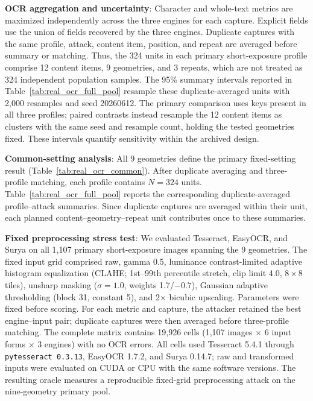 \documentclass{ieeeaccess}
\begin{document}
\textbf{OCR aggregation and uncertainty}: Character and whole-text metrics are maximized independently across the three engines for each capture. Explicit fields use the union of fields recovered by the three engines. Duplicate captures with the same profile, attack, content item, position, and repeat are averaged before summary or matching. Thus, the 324 units in each primary short-exposure profile comprise 12 content items, 9 geometries, and 3 repeats, which are not treated as 324 independent population samples. The 95\% summary intervals reported in Table~\ref{tab:real_ocr_full_pool} resample these duplicate-averaged units with 2,000 resamples and seed 20260612. The primary comparison uses keys present in all three profiles; paired contrasts instead resample the 12 content items as clusters with the same seed and resample count, holding the tested geometries fixed. These intervals quantify sensitivity within the archived design.

\textbf{Common-setting analysis}: All 9 geometries define the primary fixed-setting result (Table~\ref{tab:real_ocr_common}). After duplicate averaging and three-profile matching, each profile contains $N=324$ units. Table~\ref{tab:real_ocr_full_pool} reports the corresponding duplicate-averaged profile--attack summaries. Since duplicate captures are averaged within their unit, each planned content--geometry--repeat unit contributes once to these summaries.

\textbf{Fixed preprocessing stress test}: We evaluated Tesseract, EasyOCR, and Surya on all 1,107 primary short-exposure images spanning the 9 geometries. The fixed input grid comprised raw, gamma 0.5, luminance contrast-limited adaptive histogram equalization (CLAHE; 1st--99th percentile stretch, clip limit 4.0, $8\times8$ tiles), unsharp masking ($\sigma=1.0$, weights 1.7/$-0.7$), Gaussian adaptive thresholding (block 31, constant 5), and 2$\times$ bicubic upscaling. Parameters were fixed before scoring. For each metric and capture, the attacker retained the best engine--input pair; duplicate captures were then averaged before three-profile matching. The complete matrix contains 19,926 cells (1,107 images $\times$ 6 input forms $\times$ 3 engines) with no OCR errors. All cells used Tesseract 5.4.1 through \texttt{pytesseract 0.3.13}, EasyOCR 1.7.2, and Surya 0.14.7; raw and transformed inputs were evaluated on CUDA or CPU with the same software versions. The resulting oracle measures a reproducible fixed-grid preprocessing attack on the nine-geometry primary pool.
\end{document}
